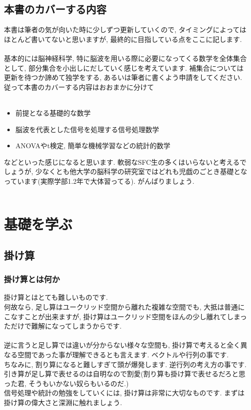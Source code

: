\documentclass[11pt,a4paper]{jreport}
\begin{document}
\section{本書のカバーする内容}
本書は筆者の気が向いた時に少しずつ更新していくので, タイミングによってはほとんど書いてないと思いますが, 最終的に目指している点をここに記します.\\
\\
基本的には脳神経科学, 特に脳波を用いる際に必要になってくる数学を全体集合として, 部分集合を小出しにだしていく感じを考えています. 補集合については更新を待つか諦めて独学をする, あるいは筆者に書くよう申請をしてください. 従って本書のカバーする内容はおおまかに分けて\\
\\
\begin{itemize}
 \item 前提となる基礎的な数学
 \item 脳波を代表とした信号を処理する信号処理数学
 \item ANOVAやt検定, 簡単な機械学習などの統計的数学
\end{itemize}

などといった感じになると思います. 軟弱なSFC生の多くはいらないと考えるでしょうが, 少なくとも他大学の脳科学の研究室ではどれも児戯のごとき基礎となっています(実際学部1.2年で大体習ってる). がんばりましょう.
\\
\\
\chapter{基礎を学ぶ　\label{basics}}
\section{掛け算}
\subsection{掛け算とは何か}
掛け算とはとても難しいものです.\\
何故なら, 足し算はユークリッド空間から離れた複雑な空間でも, 大抵は普通にこなすことが出来ますが, 掛け算はユークリッド空間をほんの少し離れてしまっただけで難解になってしまうからです. \\
\\
逆に言うと足し算では違いが分からない様々な空間も, 掛け算で考えると全く異なる空間であった事が理解できるとも言えます. ベクトルや行列の事です.\\
ちなみに, 割り算になると難しすぎて頭が爆発します. 逆行列の考え方の事です. \\
引き算が足し算で表せるのは自明なので割愛(割り算も掛け算で表せるだろと思った君, そうもいかない奴らもいるのだ.)\\
信号処理や統計の勉強をしていくには, 掛け算は非常に大切なものです. まずは掛け算の偉大さと深淵に触れましょう.\\
\\
\end{document}
